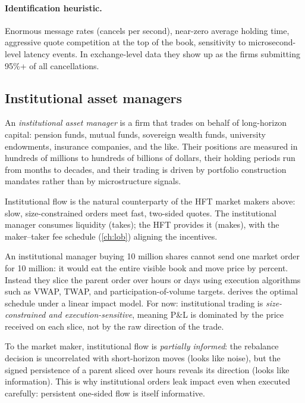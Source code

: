 \paragraph{Identification heuristic.} Enormous message rates (cancels
per second), near-zero average holding time, aggressive quote
competition at the top of the book, sensitivity to microsecond-level
latency events. In exchange-level data they show up as the firms
submitting 95\%+ of all cancellations.

\subsection{Institutional asset managers}
\label{subsec:inst}

\begin{definition}
An \emph{institutional asset manager} is a firm that trades on behalf
of long-horizon capital: pension funds, mutual funds, sovereign wealth
funds, university endowments, insurance companies, and the like. Their
positions are measured in hundreds of millions to hundreds of billions
of dollars, their holding periods run from months to decades, and
their trading is driven by portfolio construction mandates rather than
by microstructure signals.
\end{definition}

Institutional flow is the natural counterparty of the HFT market
makers above: slow, size-constrained orders meet fast, two-sided
quotes. The institutional manager consumes liquidity (takes); the
HFT provides it (makes), with the maker--taker fee schedule
(\cref{ch:lob}) aligning the incentives.

An institutional manager buying 10 million shares cannot send one
market order for 10 million: it would eat the entire visible book and
move price by percent. Instead they slice the parent order over hours
or days using execution algorithms such as VWAP, TWAP, and
participation-of-volume targets.  derives the
optimal schedule under a linear impact model. For now: institutional
trading is \emph{size-constrained and execution-sensitive}, meaning
P\&L is dominated by the price received on each slice, not by the raw
direction of the trade.

To the market maker, institutional flow is \emph{partially informed}:
the rebalance decision is uncorrelated with short-horizon moves
(looks like noise), but the signed persistence of a parent sliced
over hours reveals its direction (looks like information). This is
why institutional orders leak impact even when executed carefully:
persistent one-sided flow is itself informative.


